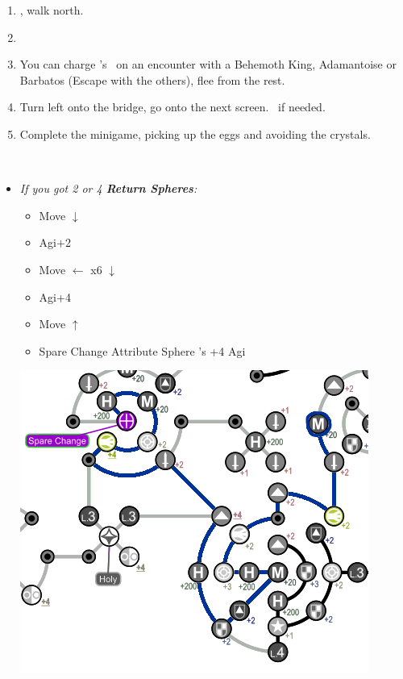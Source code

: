 \begin{enumerate}[resume]
    \item \sd, walk north.
    \item \formation{\tidus}{\kimahri}{\auron}
    \item You can charge \rikku's \od\ on an encounter with a Behemoth King, Adamantoise or Barbatos (Escape with the others), flee from the rest.
    \item Turn left onto the bridge, go onto the next screen. \save\ if needed.
    \item Complete the minigame, picking up the eggs and avoiding the crystals.
\end{enumerate}
\bothvfill\winvfill\lossvfill
\ 
\colend
\begin{spheregrid}
    \begin{multicols}{2}
        \begin{itemize}
            \item \textit{If you got 2 or 4 \textbf{Return Spheres}:}
            \begin{itemize}
                \item Move $\downarrow$
                \item Agi+2
                \item Move $\leftarrow$ x6 $\downarrow$
                \item Agi+4
                \item Move $\uparrow$
                \item Spare Change
                \yunaf Attribute Sphere \kimahri's +4 Agi
            \end{itemize}
            \includegraphics[width=.8\columnwidth]{graphics/4_Return_final_grid}

\end{itemize}
\end{multicols}
\end{spheregrid}
